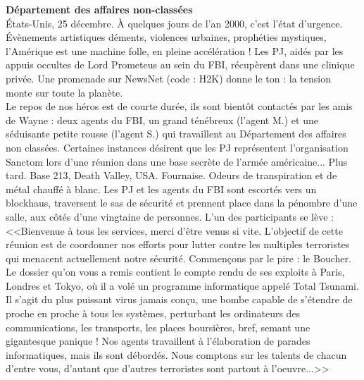 \documentclass[11pt,twoside,a4paper]{book}
\begin{document}
\clearpage

\textbf{\large D{\'e}partement des affaires non-class{\'e}es}~\\

{\'E}tats-Unis, 25 d{\'e}cembre. {\`A} quelques jours de l'an 2000, c'est l'{\'e}tat d'urgence. {\'E}v{\`e}nements artistiques d{\'e}ments, violences urbaines, proph{\'e}ties mystiques, l'Am{\'e}rique est une machine folle, en pleine acc{\'e}l{\'e}ration ! Les PJ, aid{\'e}s par les appuis occultes de Lord Prometeus au sein du FBI, r{\'e}cup{\`e}rent dans une clinique priv{\'e}e. Une promenade sur NewsNet (code : H2K) donne le ton : la tension monte sur toute la plan{\`e}te.~\\

Le repos de nos h{\'e}ros est de courte dur{\'e}e, ils sont bient{\^o}t contact{\'e}s par les amis de Wayne : deux agents du FBI, un grand t{\'e}n{\'e}breux (l'agent M.) et une s{\'e}duisante petite rousse (l'agent S.) qui travaillent au D{\'e}partement des affaires non class{\'e}es. Certaines instances d{\'e}sirent que les PJ repr{\'e}sentent l'organisation Sanctom lors d'une r{\'e}union dans une base secr{\`e}te de l'arm{\'e}e am{\'e}ricaine... Plus tard. Base 213, Death Valley, USA. Fournaise. Odeurs de transpiration et de m{\'e}tal chauff{\'e} {\`a} blanc. Les PJ et les agents du FBI sont escort{\'e}s vers un blockhaus, traversent le sas de s{\'e}curit{\'e} et prennent place dans la p{\'e}nombre d'une salle, aux c{\^o}t{\'e}s d'une vingtaine de personnes. L'un des participants se l{\`e}ve : <<Bienvenue {\`a} tous les services, merci d'{\^e}tre venus si vite. L'objectif de cette r{\'e}union est de coordonner nos efforts pour lutter contre les multiples terroristes qui menacent actuellement notre s{\'e}curit{\'e}. Commen\c{c}ons par le pire : le Boucher. Le dossier qu'on vous a remis contient le compte rendu de ses exploits {\`a} Paris, Londres et Tokyo, o{\`u} il a vol{\'e} un programme informatique appel{\'e} Total Tsunami. Il s'agit du plus puissant virus jamais con\c{c}u, une bombe capable de s'{\'e}tendre de proche en proche {\`a} tous les syst{\`e}mes, perturbant les ordinateurs des communications, les transports, les places boursi{\`e}res, bref, semant une gigantesque panique ! Nos agents travaillent {\`a} l'{\'e}laboration de parades informatiques, mais ils sont d{\'e}bord{\'e}s. Nous comptons sur les talents de chacun d'entre vous, d'autant que d'autres terroristes sont partout {\`a} l'oeuvre...>>~\\
\end{document}
